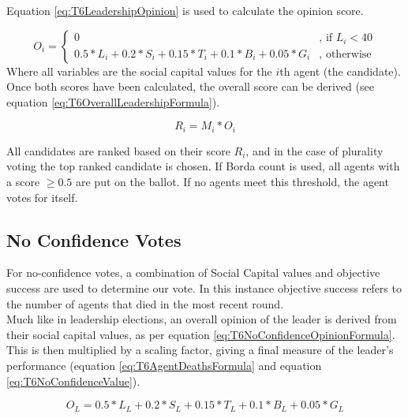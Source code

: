 Equation \ref{eq:T6LeadershipOpinion} is used to calculate the opinion score.

\begin{equation}\label{eq:T6LeadershipOpinion}
    O_{i}=\left\{
    	\begin{array}{ll}
    		0 & \mbox{, if } L_{i} < 40 \\
    	  0.5 * L_{i} + 0.2 * S_{i} + 0.15 * T_{i} + 0.1 * B_{i} + 0.05 * G_{i} & \mbox{, otherwise} 
    	\end{array}\right.
\end{equation}
Where all variables are the social capital values for the $i$th agent (the candidate).\\

Once both scores have been calculated, the overall score can be derived (see equation \ref{eq:T6OverallLeadershipFormula}).

\begin{equation}\label{eq:T6OverallLeadershipFormula}
    R_{i} = M_{i} * O_{i}
\end{equation}

All candidates are ranked based on their score $R_{i}$, and in the case of plurality voting the top ranked candidate is chosen. If Borda count is used, all agents with a score $\geq 0.5$ are put on the ballot. If no agents meet this threshold, the agent votes for itself.

\subsection{No Confidence Votes}

For no-confidence votes, a combination of Social Capital values and objective success are used to determine our vote. In this instance objective success refers to the number of agents that died in the most recent round.\\

Much like in leadership elections, an overall opinion of the leader is derived from their social capital values, as per equation \ref{eq:T6NoConfidenceOpinionFormula}. This is then multiplied by a scaling factor, giving a final measure of the leader's performance (equation \ref{eq:T6AgentDeathsFormula} and equation \ref{eq:T6NoConfidenceValue}).

\begin{equation}\label{eq:T6NoConfidenceOpinionFormula}
    O_{L} = 0.5 * L_{L} + 0.2 * S_{L} + 0.15 * T_{L} + 0.1 * B_{L} + 0.05 * G_{L}
\end{equation}


